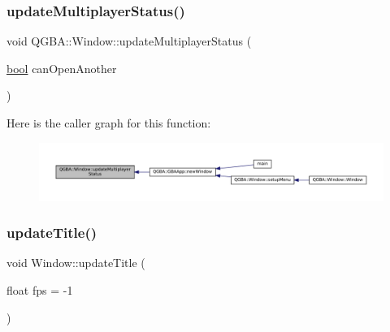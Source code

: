 \mbox{\label{class_q_g_b_a_1_1_window_acf3ddbe0a01cf461d4262e5504c70e87}} 
\subsubsection{\texorpdfstring{update\+Multiplayer\+Status()}{updateMultiplayerStatus()}}
{\footnotesize\ttfamily void Q\+G\+B\+A\+::\+Window\+::update\+Multiplayer\+Status (\begin{DoxyParamCaption}\item[{\mbox{\hyperlink{libretro_8h_a4a26dcae73fb7e1528214a068aca317e}{bool}}}]{can\+Open\+Another }\end{DoxyParamCaption})\hspace{0.3cm}{\ttfamily [inline]}}

Here is the caller graph for this function\+:
\nopagebreak
\begin{figure}[H]
\begin{center}
\leavevmode
\includegraphics[width=350pt]{class_q_g_b_a_1_1_window_acf3ddbe0a01cf461d4262e5504c70e87_icgraph}
\end{center}
\end{figure}
\mbox{\label{class_q_g_b_a_1_1_window_afdf62686722f2d43b8efc1932f545f5a}} 
\subsubsection{\texorpdfstring{update\+Title()}{updateTitle()}}
{\footnotesize\ttfamily void Window\+::update\+Title (\begin{DoxyParamCaption}\item[{float}]{fps = {\ttfamily -\/1} }\end{DoxyParamCaption})\hspace{0.3cm}{\ttfamily [private]}}

